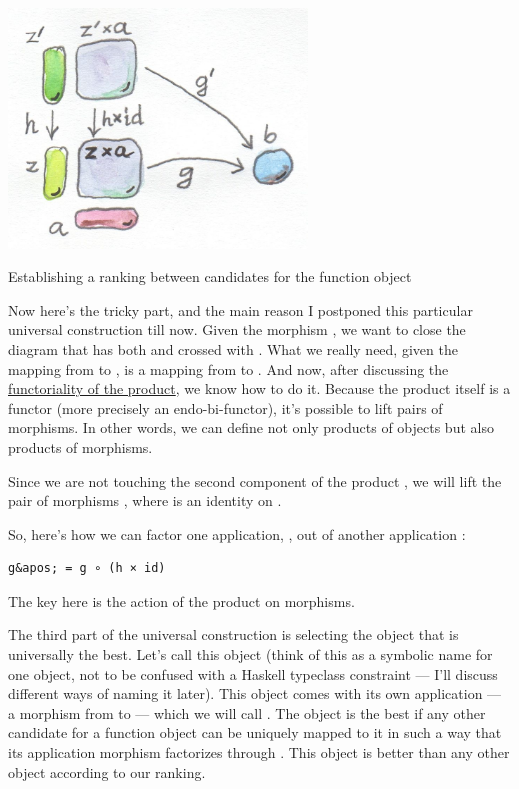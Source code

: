 \hypertarget{attachment_4245}{}
\includegraphics[width=3.12500in]{images/functionranking.jpg}

Establishing a ranking between candidates for the function object

Now here's the tricky part, and the main reason I postponed this
particular universal construction till now. Given the morphism
, we want to close the diagram
that has both  and  crossed with .
What we really need, given the mapping  from 
to , is a mapping from  to .
And now, after discussing the
\href{https://bartoszmilewski.com/2015/02/03/functoriality/}{functoriality
of the product}, we know how to do it. Because the product itself is a
functor (more precisely an endo-bi-functor), it's possible to lift pairs
of morphisms. In other words, we can define not only products of objects
but also products of morphisms.

Since we are not touching the second component of the product
, we will lift the pair of morphisms
, where  is an identity on .

So, here's how we can factor one application, , out of another
application :

\begin{verbatim}
g&apos; = g ∘ (h × id)
\end{verbatim}

The key here is the action of the product on morphisms.

The third part of the universal construction is selecting the object
that is universally the best. Let's call this object  (think
of this as a symbolic name for one object, not to be confused with a
Haskell typeclass constraint --- I'll discuss different ways of naming
it later). This object comes with its own application --- a morphism
from  to  --- which we will call
. The object  is the best if any other
candidate for a function object can be uniquely mapped to it in such a
way that its application morphism  factorizes through
. This object is better than any other object according to
our ranking.

